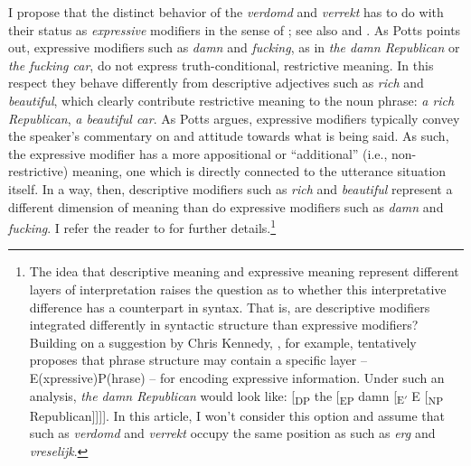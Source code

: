 \documentclass[output=paper]{langsci/langscibook}
\begin{document}
I propose that the distinct behavior of the  \emph{verdomd}
and \emph{verrekt} has to do with their status as \emph{expressive} modifiers
in the sense of \textcite{Potts2005}; see also \textcite{Potts2007} and
\citet{Morzycki2008}. As Potts points out,  expressive modifiers such as
\emph{damn} and \emph{fucking}, as in \emph{the damn Republican} or \emph{the
fucking car}, do not express truth-conditional, restrictive meaning. In this
respect they behave differently from descriptive adjectives such as \emph{rich}
and \emph{beautiful}, which clearly contribute restrictive meaning to the noun
phrase: \emph{a rich Republican}, \emph{a beautiful car}. As Potts argues,
expressive modifiers typically convey the speaker's commentary on and attitude
towards what is being said. As such, the expressive modifier has a more
appositional or \enquote{additional} (i.e., non-restrictive) meaning, one which
is directly connected to the utterance situation itself. In a way, then,
descriptive modifiers such as \emph{rich} and \emph{beautiful} represent a
different dimension of meaning than do expressive modifiers such as \emph{damn}
and \emph{fucking}. I refer the reader to \textcite{Potts2005,Potts2007} for
further details.\footnote{The idea that descriptive meaning and expressive
    meaning represent different layers of interpretation raises the question as
    to whether this interpretative difference has a counterpart in syntax. That
    is, are descriptive modifiers integrated differently in syntactic structure
    than expressive modifiers? Building on a suggestion by Chris Kennedy,
    \citet{Morzycki2008}, for example, tentatively proposes that phrase
    structure may contain a specific layer -- E(xpressive)P(hrase) – for
    encoding expressive information. Under such an analysis, \emph{the damn
    Republican} would look like: [\textsubscript{DP} the [\textsubscript{EP}
    damn [\textsubscript{E$'$} E [\textsubscript{NP} Republican]]]]. In this
    article, I won't consider this option and assume that 
such as \emph{verdomd} and \emph{verrekt} occupy the same position as
 such as \emph{erg} and \emph{vreselijk}.}
\end{document}
